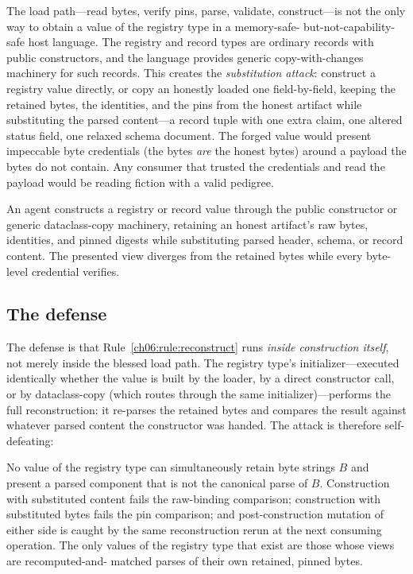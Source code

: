 The load path---read bytes, verify pins, parse, validate, construct---is
not the only way to obtain a value of the registry type in a memory-safe-
but-not-capability-safe host language. The registry and record types are
ordinary records with public constructors, and the language provides
generic copy-with-changes machinery for such records. This creates the
\emph{substitution attack}: construct a registry value directly, or copy
an honestly loaded one field-by-field, keeping the retained bytes, the
identities, and the pins from the honest artifact while substituting the
parsed content---a record tuple with one extra claim, one altered status
field, one relaxed schema document. The forged value would present
impeccable byte credentials (the bytes \emph{are} the honest bytes) around
a payload the bytes do not contain. Any consumer that trusted the
credentials and read the payload would be reading fiction with a valid
pedigree.

\begin{threat}\label{ch06:threat:substitution}
An agent constructs a registry or record value through the public
constructor or generic dataclass-copy machinery, retaining an honest
artifact's raw bytes, identities, and pinned digests while substituting
parsed header, schema, or record content. The presented view diverges
from the retained bytes while every byte-level credential verifies.
\end{threat}

\subsection{The defense}

The defense is that Rule~\ref{ch06:rule:reconstruct} runs \emph{inside
construction itself}, not merely inside the blessed load path. The
registry type's initializer---executed identically whether the value is
built by the loader, by a direct constructor call, or by dataclass-copy
(which routes through the same initializer)---performs the full
reconstruction: it re-parses the retained bytes and compares the result
against whatever parsed content the constructor was handed. The attack is
therefore self-defeating:

\begin{proposition}
\label{ch06:prop:substitution}
No value of the registry type can simultaneously retain byte strings $B$
and present a parsed component that is not the canonical parse of $B$.
Construction with substituted content fails the raw-binding comparison;
construction with substituted bytes fails the pin comparison; and
post-construction mutation of either side is caught by the same
reconstruction rerun at the next consuming operation. The only values of
the registry type that exist are those whose views are recomputed-and-
matched parses of their own retained, pinned bytes.
\end{proposition}

